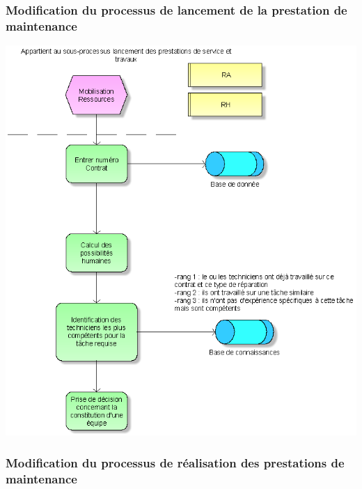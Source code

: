 \begin{itemize}
\subsubsection{Modification du processus de lancement de la prestation de maintenance}

\begin {center}
\includegraphics[width=\textwidth]{png_cible_fonctionnelle/AideMobileRessourcesHumaines.png}
\end {center}

\subsubsection{Modification du processus de réalisation des prestations de maintenance}


\end{itemize}

